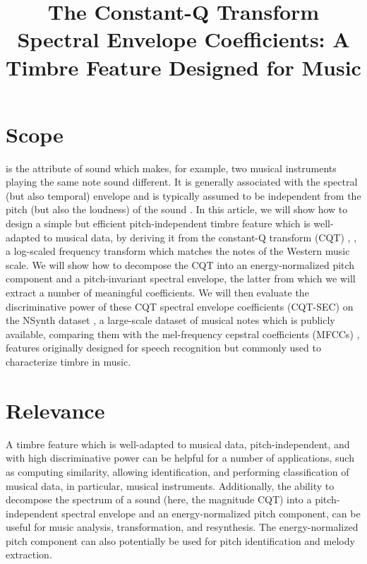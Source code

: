 \documentclass[journal]{IEEEtran}
\begin{document}
\title{The Constant-Q Transform Spectral Envelope Coefficients: A Timbre Feature Designed for Music}

\maketitle

\section{Scope}

 is the attribute of sound which makes, for example, two musical instruments playing the same note sound different. It is generally associated with the spectral (but also temporal) envelope and is typically assumed to be independent from the pitch (but also the loudness) of the sound \cite{moore2004}. In this article, we will show how to design a simple but efficient pitch-independent timbre feature which is well-adapted to musical data, by deriving it from the constant-Q transform (CQT) \cite{brown1991}, \cite{brown1992}, a log-scaled frequency transform which matches the notes of the Western music scale. We will show how to decompose the CQT into an energy-normalized pitch component and a pitch-invariant spectral envelope, the latter from which we will extract a number of meaningful coefficients. We will then evaluate the discriminative power of these CQT spectral envelope coefficients (CQT-SEC) on the NSynth dataset \cite{engel2017}, a large-scale dataset of musical notes which is publicly available, comparing them with the mel-frequency cepstral coefficients (MFCCs) \cite{davis1980}, features originally designed for speech recognition but commonly used to characterize timbre in music. 


\section{Relevance}

A timbre feature which is well-adapted to musical data, pitch-independent, and with high discriminative power can be helpful for a number of applications, such as computing similarity, allowing identification, and performing classification of musical data, in particular, musical instruments. Additionally, the ability to decompose the spectrum of a sound (here, the magnitude CQT) into a pitch-independent spectral envelope and an energy-normalized pitch component, can be useful for music analysis, transformation, and resynthesis. The energy-normalized pitch component can also potentially be used for pitch identification and melody extraction. 
\end{document}
